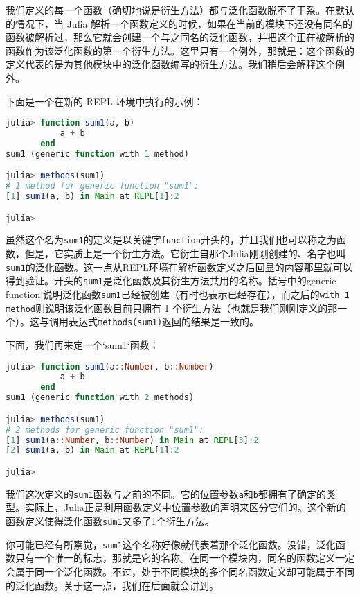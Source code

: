 我们定义的每一个函数（确切地说是衍生方法）都与泛化函数脱不了干系。在默认的情况下，当 Julia 解析一个函数定义的时候，如果在当前的模块下还没有同名的函数被解析过，那么它就会创建一个与之同名的泛化函数，并把这个正在被解析的函数作为该泛化函数的第一个衍生方法。这里只有一个例外，那就是：这个函数的定义代表的是为其他模块中的泛化函数编写的衍生方法。我们稍后会解释这个例外。

下面是一个在新的 REPL 环境中执行的示例：

\begin{lstlisting}[language=julia]
julia> function sum1(a, b)
           a + b
       end
sum1 (generic function with 1 method)

julia> methods(sum1)
# 1 method for generic function "sum1":
[1] sum1(a, b) in Main at REPL[1]:2

julia> 
\end{lstlisting}

虽然这个名为\verb`sum1`的定义是以关键字\verb`function`开头的，并且我们也可以称之为函数，但是，它实质上是一个衍生方法。它衍生自那个Julia刚刚创建的、名字也叫\verb`sum1`的泛化函数。这一点从REPL环境在解析函数定义之后回显的内容那里就可以得到验证。开头的\verb`sum1`是泛化函数及其衍生方法共用的名称。括号中的generic function|说明泛化函数\verb`sum1`已经被创建（有时也表示已经存在），而之后的\verb`with 1 method`则说明该泛化函数目前只拥有 1 个衍生方法（也就是我们刚刚定义的那一个）。这与调用表达式\verb`methods(sum1)`返回的结果是一致的。

下面，我们再来定一个`sum1`函数：

\begin{lstlisting}[language=julia]
julia> function sum1(a::Number, b::Number)
           a + b
       end
sum1 (generic function with 2 methods)

julia> methods(sum1)
# 2 methods for generic function "sum1":
[1] sum1(a::Number, b::Number) in Main at REPL[3]:2
[2] sum1(a, b) in Main at REPL[1]:2

julia> 
\end{lstlisting}

我们这次定义的\verb`sum1`函数与之前的不同。它的位置参数\verb`a`和\verb`b`都拥有了确定的类型。实际上，Julia正是利用函数定义中位置参数的声明来区分它们的。这个新的函数定义使得泛化函数\verb`sum1`又多了1个衍生方法。

你可能已经有所察觉，\verb`sum1`这个名称好像就代表着那个泛化函数。没错，泛化函数只有一个唯一的标志，那就是它的名称。在同一个模块内，同名的函数定义一定会属于同一个泛化函数。不过，处于不同模块的多个同名函数定义却可能属于不同的泛化函数。关于这一点，我们在后面就会讲到。

